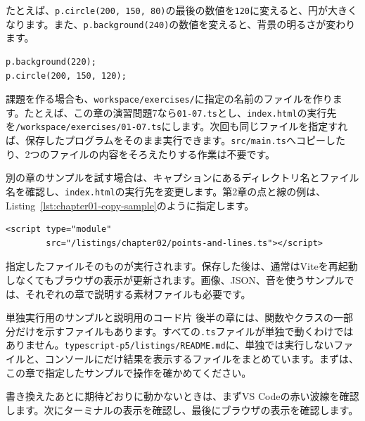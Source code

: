 たとえば、\texttt{p.circle(200, 150, 80)}の最後の数値を\texttt{120}に変えると、円が大きくなります。また、\texttt{p.background(240)}の数値を変えると、背景の明るさが変わります。

\begin{listing}[htbp]
\begin{verbatim}
p.background(220);
p.circle(200, 150, 120);
\end{verbatim}
\caption{背景と円の大きさを変更する例}
\label{lst:chapter01-edit-circle}
\end{listing}

課題を作る場合も、\texttt{workspace/exercises/}に指定の名前のファイルを作ります。たとえば、この章の演習問題7なら\texttt{01-07.ts}とし、\texttt{index.html}の実行先を\texttt{/workspace/exercises/01-07.ts}にします。次回も同じファイルを指定すれば、保存したプログラムをそのまま実行できます。\texttt{src/main.ts}へコピーしたり、2つのファイルの内容をそろえたりする作業は不要です。

別の章のサンプルを試す場合は、キャプションにあるディレクトリ名とファイル名を確認し、\texttt{index.html}の実行先を変更します。第2章の点と線の例は、Listing~\ref{lst:chapter01-copy-sample}のように指定します。

\begin{listing}[htbp]
\begin{verbatim}
<script type="module"
        src="/listings/chapter02/points-and-lines.ts"></script>
\end{verbatim}
\caption{第2章のサンプルを直接実行する指定}
\label{lst:chapter01-copy-sample}
\end{listing}

指定したファイルそのものが実行されます。保存した後は、通常はViteを再起動しなくてもブラウザの表示が更新されます。画像、JSON、音を使うサンプルでは、それぞれの章で説明する素材ファイルも必要です。

\begin{notebox}{単独実行用のサンプルと説明用のコード片}
後半の章には、関数やクラスの一部分だけを示すファイルもあります。すべての\texttt{.ts}ファイルが単独で動くわけではありません。\texttt{typescript-p5/listings/README.md}に、単独では実行しないファイルと、コンソールにだけ結果を表示するファイルをまとめています。まずは、この章で指定したサンプルで操作を確かめてください。
\end{notebox}

書き換えたあとに期待どおりに動かないときは、まずVS Codeの赤い波線を確認します。次にターミナルの表示を確認し、最後にブラウザの表示を確認します。

